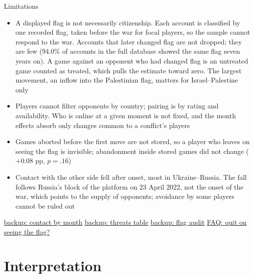 \documentclass[aspectratio=169,11pt,t]{beamer}
\newcommand{\bk}[2]{\hyperlink{#1}{\textcolor{linkblue}{\scriptsize\textsf{backup: #2}}}}
\newcommand{\fq}[2]{\hyperlink{#1}{\textcolor{linkblue}{\scriptsize\textsf{FAQ: #2}}}}
\newcommand{\links}[1]{\vfill\hfill{#1}}
\begin{document}
\begin{frame}[label=flags]{Limitations}
  \small
  \begin{itemize}
    \item A displayed flag is not necessarily citizenship. Each account is classified by one recorded flag, taken before the war for focal players, so the sample cannot respond to the war. Accounts that later changed flag are not dropped; they are few (94.0\% of accounts in the full database showed the same flag seven years on). A game against an opponent who had changed flag is an untreated game counted as treated, which pulls the estimate toward zero. The largest movement, an inflow into the Palestinian flag, matters for Israel--Palestine only
    \item Players cannot filter opponents by country; pairing is by rating and availability. Who is online at a given moment is not fixed, and the month effects absorb only changes common to a conflict's players
    \item Games aborted before the first move are not stored, so a player who leaves on seeing the flag is invisible; abandonment inside stored games did not change ($+0.08$ pp, $p = .16$)
    \item Contact with the other side fell after onset, most in Ukraine--Russia. The fall follows Russia's block of the platform on 23 April 2022, not the onset of the war, which points to the supply of opponents; avoidance by some players cannot be ruled out
  \end{itemize}
  \links{\bk{bk-contact}{contact by month} \quad \bk{threats}{threats table} \quad \bk{bk-flags}{flag audit} \quad \fq{faq-quit}{quit on seeing the flag?}}
\end{frame}

\section{Interpretation}
\end{document}
